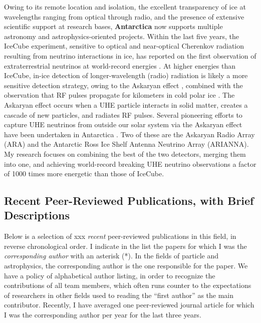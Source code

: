 \documentclass[../../main.tex]{subfiles}
\begin{document}
Owing to its remote location and isolation, the excellent transparency of ice at wavelengths ranging from optical through radio, and the presence of extensive scientific support at research bases, \textbf{Antarctica} now supports multiple astronomy and astrophysics-oriented projects.  Within the last five years,  the IceCube experiment, sensitive to optical and near-optical Cherenkov radiation resulting from neutrino interactions in ice, has reported on the first observation of extraterrestrial neutrinos at world-record energies \cite{Aartsen:2016xlq}.  At higher energies than IceCube, in-ice detection of longer-wavelength (radio) radiation is likely a more sensitive detection strategy, owing to the Askaryan effect \cite{Askaryan:1962hbi,1962JPSJS..17C.257A,1965JETP...21..658A}, combined with the observation that RF pulses propagate for kilometers in cold polar ice \cite{barrella_barwick_saltzberg_2011,barwick_besson_gorham_saltzberg_2005}.  The Askaryan effect occurs when a UHE particle interacts in solid matter, creates a cascade of new particles, and radiates RF pulses.  Several pioneering efforts to capture UHE neutrinos from outside our solar system via the Askaryan effect have been undertaken in Antarctica \cite{Allison:2015eky,Barwick:2014pca,Gorham:2008dv,Kravchenko:2001id}.  Two of these are the Askaryan Radio Array (ARA) and the Antarctic Ross Ice Shelf Antenna Neutrino Array (ARIANNA).  My research focuses on combining the best of the two detectors, merging them into one, and achieving world-record breaking UHE neutrino observations a factor of 1000 times more energetic than those of IceCube.

\subsection{Recent Peer-Reviewed Publications, with Brief Descriptions}

Below is a selection of xxx \textit{recent} peer-reviewed publications in this field, in reverse chronological order.  I indicate in the list the papers for which I was the  \textit{corresponding author} with an asterisk (*).  In the fields of particle and astrophysics, the corresponding author is the one responsible for the paper.  We have a policy of alphabetical author listing, in order to recognize the contributions of all team members, which often runs counter to the expectations of researchers in other fields used to reading the ``first author'' as the main contributor.  Recently, I have averaged one peer-reviewed journal article for which I was the corresponding author per year for the last three years.
\end{document}
